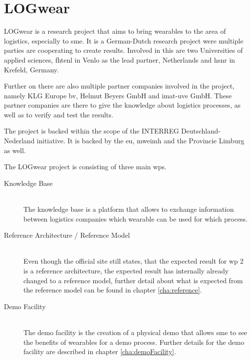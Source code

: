 \section{LOGwear}\label{sec:logwear}
LOGwear is a research project that aims to bring wearables to the area of logistics, especially to \gls{sme}. It is a German-Dutch research project were multiple parties are cooperating to create results. Involved in this are two Universities of applied sciences, \gls{fhtenl} in Venlo as the lead partner, Netherlands and \gls{hsnr} in Krefeld, Germany.

Further on there are also multiple partner companies involved in the project, namely KLG Europe bv, Helmut Beyers GmbH and imat-uve GmbH. These partner companies are there to give the knowledge about logistics processes, as well as to verify and test the results.

The project is backed within the scope of the INTERREG Deutschland-Nederland initiative. It is backed by the \gls{eu}, \gls{mweimh} and the Provincie Limburg as well.

The LOGwear project is consisting of three main \gls{wp}s. \citep{website:logwear}
\begin{description}
	\item[Knowledge Base] \hfill \\
		The knowledge base is a platform that allows to exchange information between logistics companies which wearable can be used for which process. \citep{bachelorThesis:oliver} \citep{bachelorThesis:sascha}
	\item[Reference Architecture / Reference Model] \hfill \\
		Even though the official site still states, that the expected result for \gls{wp} 2 is a reference architecture, the expected result has internally already changed to a reference model, further detail about what is expected from the reference model can be found in chapter \ref{cha:reference}.
	\item[Demo Facility] \hfill \\
		The demo facility is the creation of a physical demo that allows \gls{sme} to see the benefits of wearables for a demo process. Further details for the demo facility are described in chapter \ref{cha:demoFacility}.
\end{description}